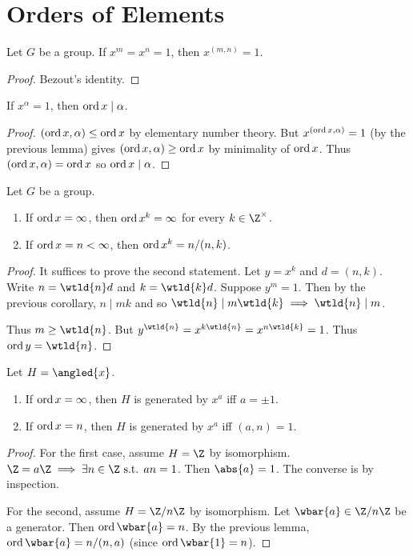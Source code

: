 \section{Orders of Elements} \label{sec:order}

\begin{lemma} \label{thm:order:bezout}
    Let $G$ be a group.
    If $x^m = x^n = 1$, then $x^{(m, n)} = 1$.
\end{lemma}
\begin{proof}
    Bezout's identity.
\end{proof}

\begin{corollary} \label{thm:order:divides}
    If $x^\alpha = 1$, then $\operatorname{ord} x \mid \alpha$.
\end{corollary}
\begin{proof}
    $(\operatorname{ord} x, \alpha) \le \operatorname{ord} x$ by elementary number theory.
    But $x^{(\operatorname{ord} x, \alpha)} = 1$ (by the previous lemma)
    gives $(\operatorname{ord} x, \alpha) \ge \operatorname{ord} x$ by minimality of $\operatorname{ord} x$.
    Thus $(\operatorname{ord} x, \alpha) = \operatorname{ord} x$ so $\operatorname{ord} x \mid \alpha$.
\end{proof}

\begin{lemma*} \label{thm:order:power}
    Let $G$ be a group.
    \begin{enumerate}
        \item If $\operatorname{ord} x = \infty$, then $\operatorname{ord} x^k = \infty$ for every
            $k \in \Z^\times$.
        \item If $\operatorname{ord} x = n < \infty$, then $\operatorname{ord} x^k = n / (n, k)$.
    \end{enumerate}
\end{lemma*}
\begin{proof}
    It suffices to prove the second statement.
    Let $y = x^k$ and $d = (n, k)$.
    Write $n = \wtld{n} d$ and $k = \wtld{k} d$.
    Suppose $y^m = 1$.
    Then by the previous corollary, $n \mid mk$ and so
    $\wtld{n} \mid m \wtld{k} \implies \wtld{n} \mid m$.

    Thus $m \ge \wtld{n}$.
    But $y^{\wtld{n}} = x^{k \wtld{n}} = x^{n \wtld{k}} = 1$.
    Thus $\ord y = \wtld{n}$.
\end{proof}

\begin{lemma*}
    Let $H = \angled{x}$.
    \begin{enumerate}
        \item If $\operatorname{ord} x = \infty$, then $H$ is generated by $x^a$ iff
            $a = \pm 1$.
        \item If $\operatorname{ord} x = n$, then $H$ is generated by $x^a$ iff
            $(a, n) = 1$.
    \end{enumerate}
\end{lemma*}
\begin{proof}
    For the first case, assume $H = \Z$ by isomorphism.
    $\Z = a\Z \implies \exists n \in \Z \st an = 1$.
    Then $\abs{a} = 1$.
    The converse is by inspection.

    For the second, assume $H = \Z/n\Z$ by isomorphism.
    Let $\wbar{a} \in \Z/n\Z$ be a generator.
    Then $\ord \wbar{a} = n$.
    By the previous lemma, $\ord \wbar{a} = n / (n, a)$
    (since $\ord \wbar{1} = n$).
\end{proof}
